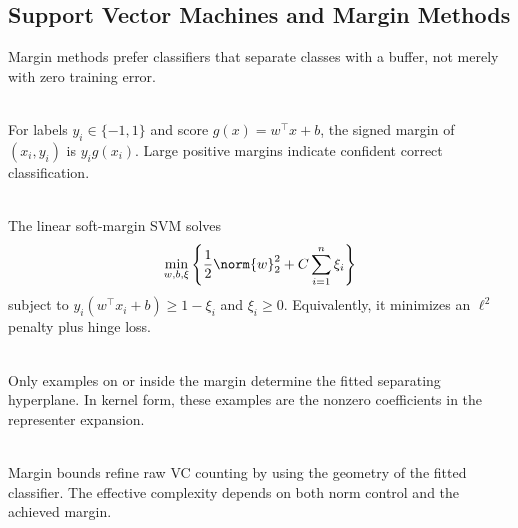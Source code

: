 \subsection{Support Vector Machines and Margin Methods}

Margin methods prefer classifiers that separate classes with a buffer, not merely with zero training error.

\begin{definition} \label{def:sl-functional-margin} \\
For labels $y_i\in\{-1,1\}$ and score $g(x)=w^\top x+b$, the signed margin of $(x_i,y_i)$ is $y_ig(x_i)$.  Large positive margins indicate confident correct classification.
\end{definition}

\begin{definition} \label{def:sl-soft-margin-svm} \\
The linear soft-margin SVM solves
\[
\min_{w,b,\xi}
\left\{\frac12\norm{w}_2^2+C\sum_{i=1}^n\xi_i\right\}
\]
subject to $y_i(w^\top x_i+b)\geq1-\xi_i$ and $\xi_i\geq0$.  Equivalently, it minimizes an $\ell^2$ penalty plus hinge loss.
\end{definition}

\begin{remark} \label{rem:sl-support-vectors} \\
Only examples on or inside the margin determine the fitted separating hyperplane.  In kernel form, these examples are the nonzero coefficients in the representer expansion.
\end{remark}

\begin{remark} \label{rem:sl-margin-generalization} \\
Margin bounds refine raw VC counting by using the geometry of the fitted classifier.  The effective complexity depends on both norm control and the achieved margin.
\end{remark}
